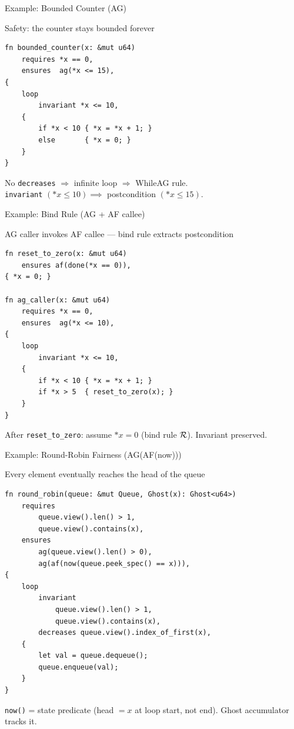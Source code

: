 \documentclass[aspectratio=169]{beamer}
\begin{document}
\begin{frame}[fragile]{Example: Bounded Counter (AG)}
  \begin{block}{Safety: the counter stays bounded forever}
  \end{block}
  \vspace{-0.2cm}
  \begin{lstlisting}
fn bounded_counter(x: &mut u64)
    requires *x == 0,
    ensures  ag(*x <= 15),
{
    loop
        invariant *x <= 10,
    {
        if *x < 10 { *x = *x + 1; }
        else       { *x = 0; }
    }
}
  \end{lstlisting}
  \vspace{-0.2cm}
  No \verb|decreases| $\Rightarrow$ infinite loop $\Rightarrow$ WhileAG rule. \\
  \verb|invariant| $(\ast x \leq 10) \implies$ postcondition $(\ast x \leq 15)$.
\end{frame}

\begin{frame}[fragile]{Example: Bind Rule (AG + AF callee)}
  \begin{block}{AG caller invokes AF callee --- bind rule extracts postcondition}
  \end{block}
  \vspace{-0.2cm}
  \begin{lstlisting}
fn reset_to_zero(x: &mut u64)
    ensures af(done(*x == 0)),
{ *x = 0; }

fn ag_caller(x: &mut u64)
    requires *x == 0,
    ensures  ag(*x <= 10),
{
    loop
        invariant *x <= 10,
    {
        if *x < 10 { *x = *x + 1; }
        if *x > 5  { reset_to_zero(x); }
    }
}
  \end{lstlisting}
  \vspace{-0.2cm}
  After \verb|reset_to_zero|: assume $\ast x = 0$ (bind rule $\mathcal{R}$). Invariant preserved.
\end{frame}

\begin{frame}[fragile]{Example: Round-Robin Fairness (AG(AF(now)))}
  \begin{block}{Every element eventually reaches the head of the queue}
  \end{block}
  \vspace{-0.2cm}
  \begin{lstlisting}
fn round_robin(queue: &mut Queue, Ghost(x): Ghost<u64>)
    requires
        queue.view().len() > 1,
        queue.view().contains(x),
    ensures
        ag(queue.view().len() > 0),
        ag(af(now(queue.peek_spec() == x))),
{
    loop
        invariant
            queue.view().len() > 1,
            queue.view().contains(x),
        decreases queue.view().index_of_first(x),
    {
        let val = queue.dequeue();
        queue.enqueue(val);
    }
}
  \end{lstlisting}
  \vspace{-0.3cm}
  {\footnotesize \verb|now()| = state predicate (head $= x$ at loop start, not end). Ghost accumulator tracks it.}
\end{frame}
\end{document}

